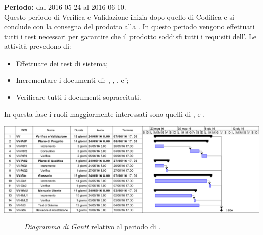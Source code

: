 \subsubsection{\VV}
\textbf{Periodo:} dal 2016-05-24 al 2016-06-10. \\
Questo periodo di Verifica e Validazione inizia dopo quello di Codifica e si conclude con la consegna del prodotto alla \RA. In questo periodo vengono effettuati tutti i test necessari per garantire che il prodotto soddisfi tutti i requisiti dell'\AR.  
Le attività prevedono di:
\begin{itemize}
	\item Effettuare dei test di sistema;  
	\item Incrementare i documenti di: \textit{\MU}, \textit{\NdP}, \textit{\PdP}, \textit{\PdQ} e \textit{\G};
	\item Verificare tutti i documenti sopraccitati.
\end{itemize}
In questa fase i ruoli maggiormente interessati sono quelli di \textit{\Res}, \textit{\Prog} e \textit{\Ver}. 
\newpage
\begin{center}
	\includegraphics[keepaspectratio = true, width=16cm]{immagini/PdP_VerificaEValidazioneGantt.png}
\end{center}
\begin{figure}[h]
	\caption{\textit{Diagramma di Gantt} relativo al periodo di \VV.}\label{etichetta}
\end{figure}